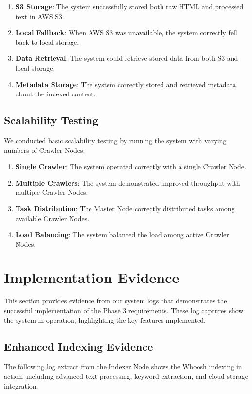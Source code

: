 \documentclass[12pt]{article}
\begin{document}
\begin{enumerate}
    \item \textbf{S3 Storage}: The system successfully stored both raw HTML and processed text in AWS S3.
    \item \textbf{Local Fallback}: When AWS S3 was unavailable, the system correctly fell back to local storage.
    \item \textbf{Data Retrieval}: The system could retrieve stored data from both S3 and local storage.
    \item \textbf{Metadata Storage}: The system correctly stored and retrieved metadata about the indexed content.
\end{enumerate}

\subsection{Scalability Testing}
We conducted basic scalability testing by running the system with varying numbers of Crawler Nodes:

\begin{enumerate}
    \item \textbf{Single Crawler}: The system operated correctly with a single Crawler Node.
    \item \textbf{Multiple Crawlers}: The system demonstrated improved throughput with multiple Crawler Nodes.
    \item \textbf{Task Distribution}: The Master Node correctly distributed tasks among available Crawler Nodes.
    \item \textbf{Load Balancing}: The system balanced the load among active Crawler Nodes.
\end{enumerate}

\section{Implementation Evidence}
This section provides evidence from our system logs that demonstrates the successful implementation of the Phase 3 requirements. These log captures show the system in operation, highlighting the key features implemented.

\subsection{Enhanced Indexing Evidence}
The following log extract from the Indexer Node shows the Whoosh indexing in action, including advanced text processing, keyword extraction, and cloud storage integration:
\end{document}
